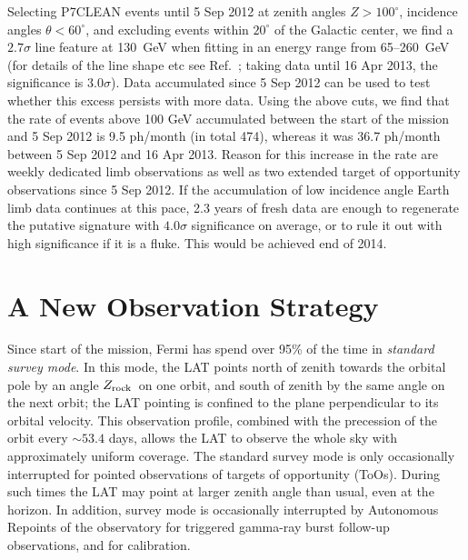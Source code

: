 \documentclass[aps,prd,superscriptaddress,showpacs,nofootinbib,fixlfloat, 12pt]{revtex4-1}
\newcommand{\Fermi}{{\slshape Fermi}}
\newcommand{\degree}{^{\rm o}}
\newcommand{\zrock}{$Z_{\rm rock}$}
\begin{document}
Selecting P7CLEAN events until 5 Sep 2012 at zenith angles $Z>100^\circ$,
incidence angles $\theta<60^\circ$, and excluding events within $20^\circ$ of
the Galactic center, we find a $2.7\sigma$ line feature at 130~GeV when
fitting in an energy range from 65--260~GeV (for details of the line shape etc
see Ref.~\cite{finkbeiner_systematics}; taking data until 16 Apr 2013, the
significance is $3.0\sigma$). Data accumulated since 5 Sep 2012 can
be used to test whether this excess persists with more data. Using the above
cuts, we find that the rate of events above 100 GeV accumulated between the
start of the mission and 5 Sep 2012 is 9.5 ph/month (in total 474), whereas it
was 36.7 ph/month between 5 Sep 2012 and 16 Apr 2013. Reason for this increase
in the rate are weekly dedicated limb observations as well as two extended
target of opportunity observations since 5 Sep 2012. If the accumulation of
low incidence angle Earth limb data continues at this pace, 2.3 years of fresh
data are enough to regenerate the putative signature with $4.0\sigma$
significance on average, or to rule it out with high significance if it is a
fluke. This would be achieved end of 2014.

\section{A New Observation Strategy}
Since start of the mission, Fermi has spend over 95\% of the time in
\emph{standard survey mode}.
In this mode, the LAT points north of zenith towards the orbital pole by an
angle \zrock\ on one orbit, and south of zenith by the same angle on the next
orbit; the LAT pointing is confined to the plane perpendicular to its orbital
velocity. 
This observation profile, combined with the precession of the orbit every
$\sim53.4$ days, allows the LAT to observe the whole sky with approximately
uniform coverage. The standard survey mode is only occasionally interrupted
for pointed observations of targets of opportunity (ToOs). During such times
the LAT may point at larger zenith angle than usual, even at the horizon.  In
addition, survey mode is occasionally interrupted by Autonomous Repoints of
the observatory for triggered gamma-ray burst follow-up observations, and for
calibration.
\end{document}
